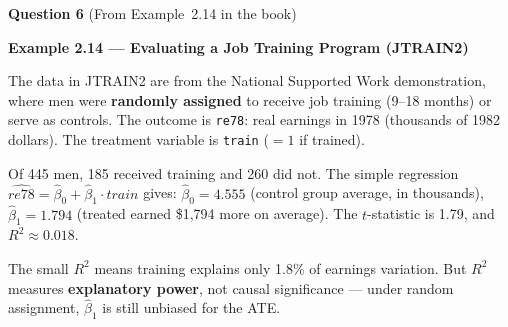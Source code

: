 \documentclass[11pt,a4paper]{article}
\begin{document}
\textbf{Question 6} (From Example~2.14 in the book)

\begin{bookexample}
\textbf{\color{blockcolor}Example 2.14 --- Evaluating a Job Training Program (JTRAIN2)}

\smallskip
The data in JTRAIN2 are from the National Supported Work demonstration, where men were \textbf{randomly assigned} to receive job training (9--18 months) or serve as controls. The outcome is \texttt{re78}: real earnings in 1978 (thousands of 1982 dollars). The treatment variable is \texttt{train} ($= 1$ if trained).

Of 445 men, 185 received training and 260 did not. The simple regression $\widehat{re78} = \hat{\beta}_0 + \hat{\beta}_1 \cdot train$ gives: $\hat{\beta}_0 = 4.555$ (control group average, in thousands), $\hat{\beta}_1 = 1.794$ (treated earned \$1{,}794 more on average). The $t$-statistic is 1.79, and $R^2 \approx 0.018$.

The small $R^2$ means training explains only 1.8\% of earnings variation. But $R^2$ measures \textbf{explanatory power}, not causal significance --- under random assignment, $\hat{\beta}_1$ is still unbiased for the ATE.
\end{bookexample}
\end{document}
